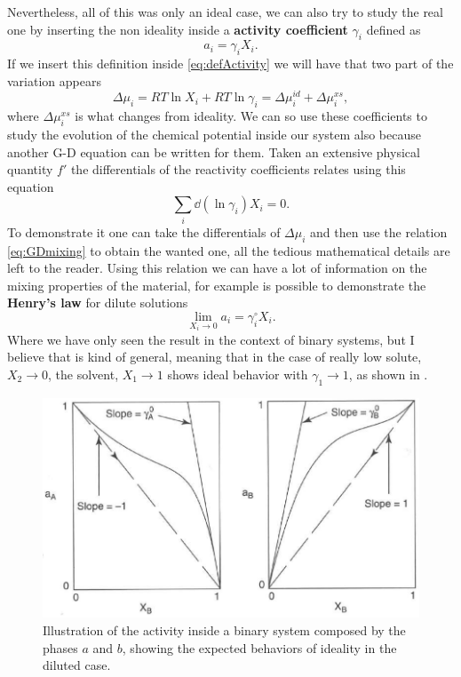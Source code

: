 Nevertheless, all of this was only an ideal case, we can also try to study the real one by inserting the non ideality inside a \textbf{activity coefficient} $\gamma_i$ defined as
\begin{equation}
    a_i = \gamma_i X_i.
\end{equation}
If we insert this definition inside \eqref{eq:defActivity} we will have that two part of the variation appears
\begin{equation}
    \Delta\mu_i = RT\ln X_i + RT \ln \gamma_i = \Delta\mu_i^{id} + \Delta\mu_i^{xs},
\end{equation}
where $\Delta\mu_i^{xs}$ is what changes from ideality. We can so use these coefficients to study the evolution of the chemical potential inside our system also because another G-D equation can be written for them.
{
    Taken an extensive physical quantity $f'$ the differentials of the reactivity coefficients relates using this equation
    \begin{equation}
        \sum_i\dd (\ln \gamma_i) X_i = 0.
    \end{equation}
}
{
    To demonstrate it one can take the differentials of $\Delta\mu_i$ and then use the relation \eqref{eq:GDmixing} to obtain the wanted one, all the tedious mathematical details are left to the reader.
}
\noindent
Using this relation we can have a lot of information on the mixing properties of the material, for example is possible to demonstrate the \textbf{Henry's law} for dilute solutions
\begin{equation}
    \lim_{X_i \to 0} a_i = \gamma_i^\circ X_i.
\end{equation}
Where we have only seen the result in the context of binary systems, but I believe that is kind of general, meaning that in the case of really low solute, $X_2 \to 0$, the solvent, $X_1\to 1$ shows ideal behavior with $\gamma_1 \to 1$, as shown in .

\begin{figure}[t]
    \centering
    \includegraphics[width=0.6\linewidth]{Immagini/HenryLaw.png}
    \caption{
        Illustration of the activity inside a binary system composed by the phases $a$ and $b$, showing the expected behaviors of ideality in the diluted case. 
    }
    \label{fig:HenryLaw}
\end{figure}

